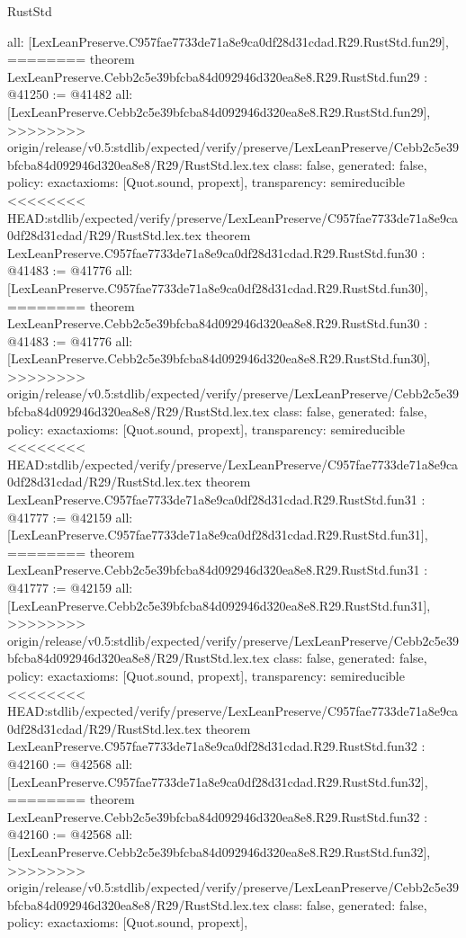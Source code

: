 \begin{lexlean}{RustStd}
\begin{coremodule}
{\begin{coremodule}
{{{{{{{{{{{{{{{{{{{{{{{{{{{{{{{{  all: [LexLeanPreserve.C957fae7733de71a8e9ca0df28d31cdad.R29.RustStd.fun29],
========
theorem LexLeanPreserve.Cebb2c5e39bfcba84d092946d320ea8e8.R29.RustStd.fun29 : @41250 := @41482 {
  all: [LexLeanPreserve.Cebb2c5e39bfcba84d092946d320ea8e8.R29.RustStd.fun29],
>>>>>>>> origin/release/v0.5:stdlib/expected/verify/preserve/LexLeanPreserve/Cebb2c5e39bfcba84d092946d320ea8e8/R29/RustStd.lex.tex
  class: false,
  generated: false,
  policy: exact{axioms: [Quot.sound, propext]},
  transparency: semireducible
}
<<<<<<<< HEAD:stdlib/expected/verify/preserve/LexLeanPreserve/C957fae7733de71a8e9ca0df28d31cdad/R29/RustStd.lex.tex
theorem LexLeanPreserve.C957fae7733de71a8e9ca0df28d31cdad.R29.RustStd.fun30 : @41483 := @41776 {
  all: [LexLeanPreserve.C957fae7733de71a8e9ca0df28d31cdad.R29.RustStd.fun30],
========
theorem LexLeanPreserve.Cebb2c5e39bfcba84d092946d320ea8e8.R29.RustStd.fun30 : @41483 := @41776 {
  all: [LexLeanPreserve.Cebb2c5e39bfcba84d092946d320ea8e8.R29.RustStd.fun30],
>>>>>>>> origin/release/v0.5:stdlib/expected/verify/preserve/LexLeanPreserve/Cebb2c5e39bfcba84d092946d320ea8e8/R29/RustStd.lex.tex
  class: false,
  generated: false,
  policy: exact{axioms: [Quot.sound, propext]},
  transparency: semireducible
}
<<<<<<<< HEAD:stdlib/expected/verify/preserve/LexLeanPreserve/C957fae7733de71a8e9ca0df28d31cdad/R29/RustStd.lex.tex
theorem LexLeanPreserve.C957fae7733de71a8e9ca0df28d31cdad.R29.RustStd.fun31 : @41777 := @42159 {
  all: [LexLeanPreserve.C957fae7733de71a8e9ca0df28d31cdad.R29.RustStd.fun31],
========
theorem LexLeanPreserve.Cebb2c5e39bfcba84d092946d320ea8e8.R29.RustStd.fun31 : @41777 := @42159 {
  all: [LexLeanPreserve.Cebb2c5e39bfcba84d092946d320ea8e8.R29.RustStd.fun31],
>>>>>>>> origin/release/v0.5:stdlib/expected/verify/preserve/LexLeanPreserve/Cebb2c5e39bfcba84d092946d320ea8e8/R29/RustStd.lex.tex
  class: false,
  generated: false,
  policy: exact{axioms: [Quot.sound, propext]},
  transparency: semireducible
}
<<<<<<<< HEAD:stdlib/expected/verify/preserve/LexLeanPreserve/C957fae7733de71a8e9ca0df28d31cdad/R29/RustStd.lex.tex
theorem LexLeanPreserve.C957fae7733de71a8e9ca0df28d31cdad.R29.RustStd.fun32 : @42160 := @42568 {
  all: [LexLeanPreserve.C957fae7733de71a8e9ca0df28d31cdad.R29.RustStd.fun32],
========
theorem LexLeanPreserve.Cebb2c5e39bfcba84d092946d320ea8e8.R29.RustStd.fun32 : @42160 := @42568 {
  all: [LexLeanPreserve.Cebb2c5e39bfcba84d092946d320ea8e8.R29.RustStd.fun32],
>>>>>>>> origin/release/v0.5:stdlib/expected/verify/preserve/LexLeanPreserve/Cebb2c5e39bfcba84d092946d320ea8e8/R29/RustStd.lex.tex
  class: false,
  generated: false,
  policy: exact{axioms: [Quot.sound, propext]},
}}}}}}}}}}}}}}}}}}}}}}}}}}}}}}}}}}}}
\end{coremodule}}
\end{coremodule}
\end{lexlean}
